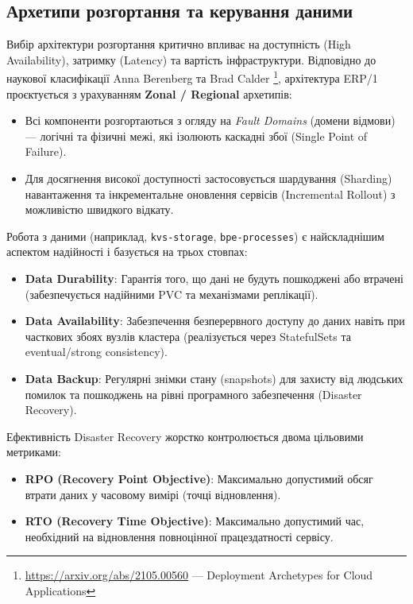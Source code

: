 \documentclass[12pt,a4paper]{article}
\begin{document}
\newpage
\subsection{Архетипи розгортання та керування даними}

Вибір архітектури розгортання критично впливає на доступність (High Availability), затримку (Latency) та вартість інфраструктури.
Відповідно до наукової класифікації Anna Berenberg та Brad Calder \footnote{\url{https://arxiv.org/abs/2105.00560} --- Deployment
Archetypes for Cloud Applications}, архітектура ERP/1 проєктується з урахуванням \textbf{Zonal / Regional} архетипів:

\begin{itemize}[leftmargin=1.5cm]
    \item Всі компоненти розгортаються з огляду на \textit{Fault Domains} (домени відмови) --- логічні та фізичні межі, які ізолюють каскадні збої (Single Point of Failure).
    \item Для досягнення високої доступності застосовується шардування (Sharding) навантаження та інкрементальне оновлення сервісів (Incremental Rollout) з можливістю швидкого відкату.
\end{itemize}

Робота з даними (наприклад, \texttt{kvs-storage}, \texttt{bpe-processes}) є найскладнішим аспектом надійності і базується на трьох стовпах:

\begin{itemize}[leftmargin=1.5cm]
    \item \textbf{Data Durability}: Гарантія того, що дані не будуть пошкоджені або втрачені (забезпечується надійними PVC та механізмами реплікації).
    \item \textbf{Data Availability}: Забезпечення безперервного доступу до даних навіть при часткових збоях вузлів кластера (реалізується через StatefulSets та eventual/strong consistency).
    \item \textbf{Data Backup}: Регулярні знімки стану (snapshots) для захисту від людських помилок та пошкоджень на рівні програмного забезпечення (Disaster Recovery).
\end{itemize}

Ефективність Disaster Recovery жорстко контролюється двома цільовими метриками:
\begin{itemize}[leftmargin=1.5cm]
    \item \textbf{RPO (Recovery Point Objective)}: Максимально допустимий обсяг втрати даних у часовому вимірі (точці відновлення).
    \item \textbf{RTO (Recovery Time Objective)}: Максимально допустимий час, необхідний на відновлення повноцінної працездатності сервісу.
\end{itemize}
\end{document}
